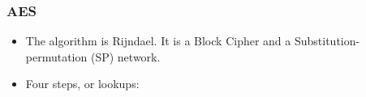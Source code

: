 \begin{frame}
  \frametitle{AES}
  \begin{minipage}[t]{\linewidth}
    \begin{itemize}
    \item The algorithm is Rijndael. It is a Block Cipher and a Substitution-permutation (SP) network.
    \item Four steps, or lookups:
    \end{itemize}
  \end{minipage}


\end{frame}
